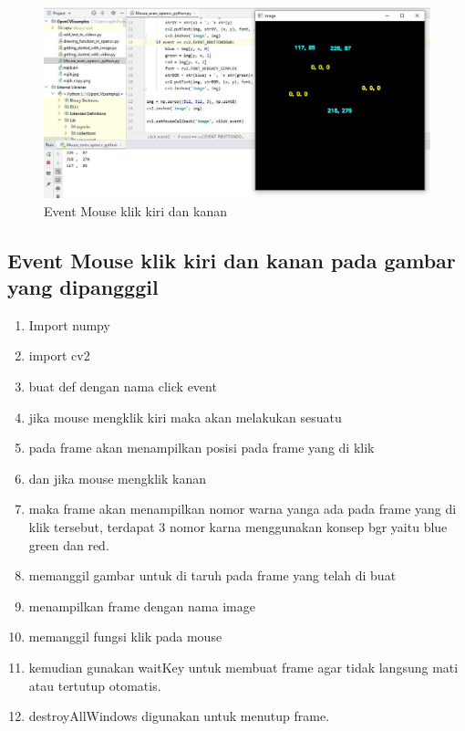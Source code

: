\begin{figure}[ht]
\centering
\includegraphics[scale=0.4]{figures/2,21.jpg}
\caption{Event Mouse klik kiri dan kanan}
\label{contoh}
\end{figure}



\newpage
\subsection{Event Mouse klik kiri dan kanan pada gambar yang dipangggil}

\begin{enumerate}
	\item Import numpy
	\item import cv2
	\item buat def dengan nama click event
	\item jika mouse mengklik kiri maka akan melakukan sesuatu
	\item pada frame akan menampilkan posisi pada frame yang di klik
	\item dan jika mouse mengklik kanan
	\item maka frame akan menampilkan nomor warna yanga ada pada frame yang di klik tersebut, terdapat 3 nomor karna menggunakan konsep bgr yaitu blue green dan red.
	\item memanggil gambar untuk di taruh pada frame yang telah di buat
	\item menampilkan frame dengan nama image
	\item memanggil fungsi klik pada mouse
	\item kemudian gunakan waitKey untuk membuat frame agar tidak langsung mati atau tertutup otomatis.
	\item destroyAllWindows digunakan untuk menutup frame.
\end{enumerate}

